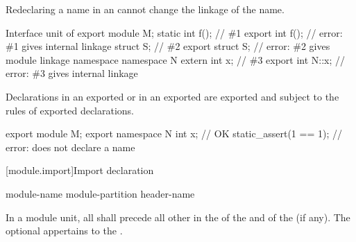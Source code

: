 \pnum
\begin{note}
Redeclaring a name in an 
cannot change the linkage of the name.
\begin{example}
\begin{codeblocktu}{Interface unit of }
export module M;
static int f();                 // \#1
export int f();                 // error: \#1 gives internal linkage
struct S;                       // \#2
export struct S;                // error: \#2 gives module linkage
namespace {
  namespace N {
    extern int x;               // \#3
  }
}
export int N::x;                // error: \#3 gives internal linkage
\end{codeblocktu}
\end{example}
\end{note}

\pnum
\begin{note}
Declarations in an exported 
or in an exported 
are exported and subject to the rules of exported declarations.
\begin{example}
\begin{codeblock}
export module M;
export namespace N {
  int x;                        // OK
  static_assert(1 == 1);        // error: does not declare a name
}
\end{codeblock}
\end{example}
\end{note}

[module.import]{Import declaration}%

\begin{bnf}
\br
      module-name  \terminal{;}\br
      module-partition  \terminal{;}\br
      header-name  \terminal{;}
\end{bnf}

\pnum
In a module unit, all 
shall precede all other  in
the  of the
and of the  (if any).
The optional 
appertains to the .

